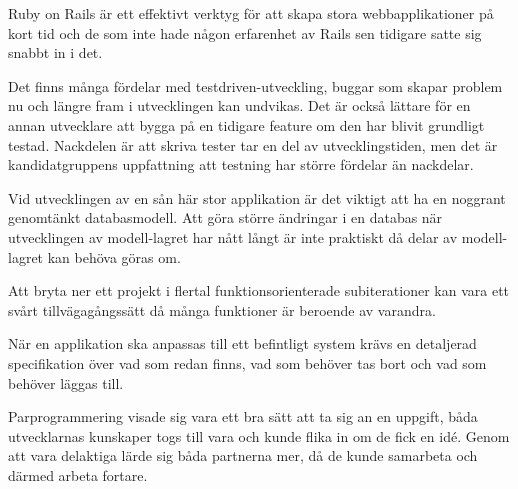Ruby on Rails är ett effektivt verktyg för att skapa stora webbapplikationer på kort tid och de som inte hade någon erfarenhet av Rails sen tidigare satte sig snabbt in i det.

Det finns många fördelar med testdriven-utveckling, buggar som skapar problem nu och längre fram i utvecklingen kan undvikas. Det är också lättare för en annan utvecklare att bygga på en tidigare feature om den har blivit grundligt testad. Nackdelen är att skriva tester tar en del av utvecklingstiden, men det är kandidatgruppens uppfattning att testning har större fördelar än nackdelar.

Vid utvecklingen av en sån här stor applikation är det viktigt att ha en noggrant genomtänkt databasmodell. Att göra större ändringar i en databas när utvecklingen av modell-lagret har nått långt är inte praktiskt då delar av modell-lagret kan behöva göras om.

Att bryta ner ett projekt i flertal funktionsorienterade subiterationer kan vara ett svårt tillvägagångssätt då många funktioner är beroende av varandra.

När en applikation ska anpassas till ett befintligt system krävs en detaljerad specifikation över vad som redan finns, vad som behöver tas bort och vad som behöver läggas till.

Parprogrammering visade sig vara ett bra sätt att ta sig an en uppgift, båda utvecklarnas kunskaper togs till vara och kunde flika in om de fick en idé. Genom att vara delaktiga lärde sig båda partnerna mer, då de kunde samarbeta och därmed arbeta fortare.
